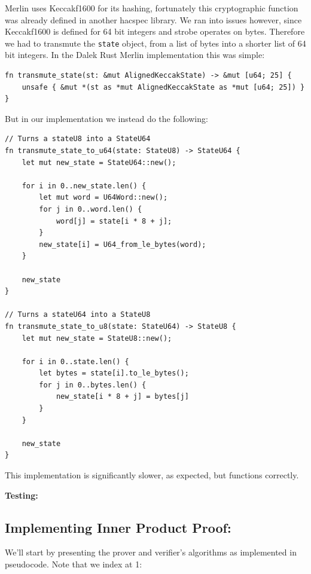 \documentclass{article}
\begin{document}
Merlin uses Keccakf1600 for its hashing, fortunately this cryptographic
function was already defined in another hacspec library. We ran into
issues however, since Keccakf1600 is defined for 64 bit integers
and strobe operates on bytes. Therefore we had to transmute the
\texttt{state} object, from a list of bytes into a shorter list of 64
bit integers. In the Dalek Rust Merlin implementation this was simple:

\begin{lstlisting}
fn transmute_state(st: &mut AlignedKeccakState) -> &mut [u64; 25] {
    unsafe { &mut *(st as *mut AlignedKeccakState as *mut [u64; 25]) }
}
\end{lstlisting}

But in our implementation we instead do the following: 

\begin{lstlisting}
// Turns a stateU8 into a StateU64
fn transmute_state_to_u64(state: StateU8) -> StateU64 {
	let mut new_state = StateU64::new();

	for i in 0..new_state.len() {
		let mut word = U64Word::new();
		for j in 0..word.len() {
			word[j] = state[i * 8 + j];
		}
		new_state[i] = U64_from_le_bytes(word);
	}

	new_state
}

// Turns a stateU64 into a StateU8
fn transmute_state_to_u8(state: StateU64) -> StateU8 {
	let mut new_state = StateU8::new();

	for i in 0..state.len() {
		let bytes = state[i].to_le_bytes();
		for j in 0..bytes.len() {
			new_state[i * 8 + j] = bytes[j]
		}
	}

	new_state
}
\end{lstlisting}

This implementation is significantly slower, as expected, but functions
correctly.

\textbf{Testing:}

\subsection{Implementing Inner Product Proof:} \label{implementing-inner-product-proof}

We'll start by presenting the prover and verifier's algorithms as
implemented in pseudocode. Note that we index at 1:
\end{document}
